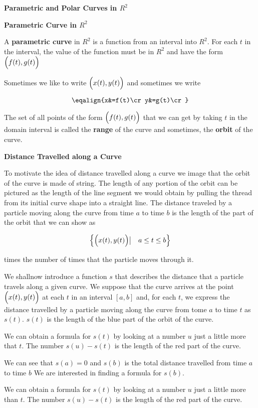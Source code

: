 {\bf Parametric and Polar Curves in $R^2$}

\vskip 1mm
{\bf Parametric Curve in $R^2$}

\vskip 1mm
A {\bf parametric curve} in $R^2$ is a function from an interval into $R^2$. For each $t$ in the interval, the value of the function must be in $R^2$ and have the form $\Bigl(f(t),g(t)\Bigr)$

\vskip 1mm
Sometimes we like to write $\Bigl(x(t),y(t)\Bigr)$ and sometimes we write

$$\eqalign{x&=f(t)\cr
	y&=g(t)\cr}$$

The set of all points of the form $\Bigl(f(t),g(t)\Bigr)$ that we can get by taking $t$ in the domain interval is called the {\bf range} of the curve and sometimes, the {\bf orbit} of the curve.

\filbreak
\vskip 1cm
{\bf Distance Travelled along a Curve}

\vskip 1mm
To motivate the idea of distance travelled along a curve we image that the orbit of the curve is made of string. The length of any portion of the orbit can be pictured as the length of the line segment we would obtain by pulling the thread from its initial curve shape into a straight line. The distance traveled by a particle moving along the curve from time $a$ to time $b$ is the length of the part of the orbit that we can show as

$$\Bigl\{\Bigl(x(t),y(t)\Bigr)\bigl|\quad a\leq t\leq b\Bigr\}$$

times the number of times that the particle moves through it.

\vskip 1mm
We shallnow introduce a function $s$ that describes the distance that a particle travels along a given curve. We suppose that the curve arrives at the point $\Bigl(x(t),y(t)\Bigr)$ at each $t$ in an interval $[a,b]$ and, for each $t$, we express the distance travelled by a particle moving along the curve from tome $a$ to time $t$ as $s(t)$. $s(t)$ is the length of the blue part of the orbit of the curve.

\vskip 1mm
We can obtain a formula for $s(t)$ by looking at a number $u$ just a little more that $t$. The number $s(u)-s(t)$ is the length of the red part of the curve.

\vskip 1mm
We can see that $s(a)=0$ and $s(b)$ is the total distance travelled from time $a$ to time $b$ We are interested in finding a formula for $s(b)$.

\vskip 1mm
We can obtain a formula for $s(t)$ by looking at a number $u$ just a little more than $t$. The number $s(u)-s(t)$ is the length of the red part of the curve.


